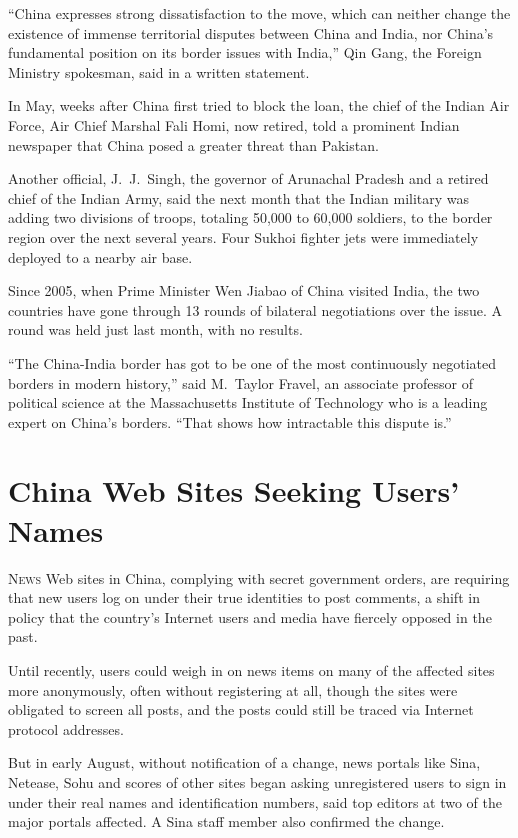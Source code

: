 ﻿\documentclass[12pt]{article}
\begin{document}
``China expresses strong dissatisfaction to the move, which can neither change the existence of
immense territorial disputes between China and India, nor China's fundamental position on its border
issues with India,'' Qin Gang, the Foreign Ministry spokesman, said in a written statement.

In May, weeks after China first tried to block the loan, the chief of the Indian Air Force, Air
Chief Marshal Fali Homi, now retired, told a prominent Indian newspaper that China posed a greater
threat than Pakistan.

Another official, J.~J.~Singh, the governor of Arunachal Pradesh and a retired chief of the Indian
Army, said the next month that the Indian military was adding two divisions of troops, totaling
50,000 to 60,000 soldiers, to the border region over the next several years. Four Sukhoi fighter
jets were immediately deployed to a nearby air base.

Since 2005, when Prime Minister Wen Jiabao of China visited India, the two countries have gone
through 13 rounds of bilateral negotiations over the issue. A round was held just last month, with
no results.

``The China-India border has got to be one of the most continuously negotiated borders in modern
history,'' said M.~Taylor Fravel, an associate professor of political science at the Massachusetts
Institute of Technology who is a leading expert on China's borders. ``That shows how intractable
this dispute is.''

\section{China Web Sites Seeking Users' Names}

\lettrine{N}{ews} Web sites in China, complying with secret government orders, are requiring that
new users log on under their true identities to post comments, a shift in policy that the country's
Internet users and media have fiercely opposed in the past.

Until recently, users could weigh in on news items on many of the affected sites more anonymously,
often without registering at all, though the sites were obligated to screen all posts, and the posts
could still be traced via Internet protocol addresses.

But in early August, without notification of a change, news portals like Sina, Netease, Sohu and
scores of other sites began asking unregistered users to sign in under their real names and
identification numbers, said top editors at two of the major portals affected. A Sina staff member
also confirmed the change.
\end{document}
